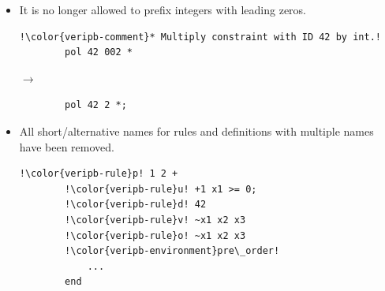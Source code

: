 \documentclass[a4paper]{article}
\newcommand{\veriPB}[0]{\textsc{VeriPB}}
\begin{document}
\begin{itemize}
\begin{minipage}[t]{.05\linewidth}
		      \centering \vspace*{-5mm}$\to$
	      \end{minipage}\hfill%
	      \hfill%
	      \begin{minipage}{.47\linewidth}
		      \begin{lstlisting}[language=veripb, gobble=8, rulecolor=\color{veripb-valid-text}, caption={\veriPB{} 3.0 syntax.}]
		% The line below does NOT add a new ID!
		@label e +1 x1 >= 1;
		\end{lstlisting}
	      \end{minipage}
	\item It is no longer allowed to prefix integers with leading zeros.
	      \\[1mm]
	      \begin{minipage}{.47\linewidth}
		      \begin{lstlisting}[language=veripb, gobble=8, rulecolor=\color{veripb-invalid-text}, caption={\veriPB{} 2.0 syntax.}]
		!\color{veripb-comment}* Multiply constraint with ID 42 by int.!
		pol 42 002 *
		\end{lstlisting}
	      \end{minipage}\hfill%
	      \begin{minipage}[t]{.05\linewidth}
		      \centering \vspace*{-5mm}$\to$
	      \end{minipage}\hfill%
	      \hfill%
	      \begin{minipage}{.47\linewidth}
		      \begin{lstlisting}[language=veripb, gobble=8, rulecolor=\color{veripb-valid-text}, caption={\veriPB{} 3.0 syntax.}]
		% Multiply constraint with ID 42 by int.
		pol 42 2 *;
		\end{lstlisting}
	      \end{minipage}
	\item All short/alternative names for rules and definitions with multiple names have been removed.
	      \\[1mm]
	      \begin{minipage}{.47\linewidth}
		      \begin{lstlisting}[language=veripb, gobble=8, rulecolor=\color{veripb-invalid-text}, caption={\veriPB{} 2.0 syntax.}]
		!\color{veripb-rule}p! 1 2 +
		!\color{veripb-rule}u! +1 x1 >= 0;
		!\color{veripb-rule}d! 42
		!\color{veripb-rule}v! ~x1 x2 x3
		!\color{veripb-rule}o! ~x1 x2 x3
		!\color{veripb-environment}pre\_order!
			...
		end
		\end{lstlisting}
	      \end{minipage}\hfill%

\end{itemize}
\end{document}
